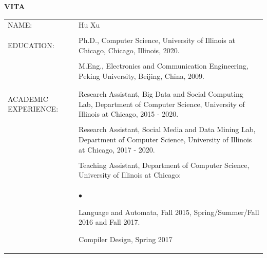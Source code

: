 \documentclass{uicthesi}
\newcommand{\squishlist}{
   \begin{list}{$\bullet$}
    { \setlength{\itemsep}{-.1ex}      \setlength{\parsep}{0ex}
      \setlength{\topsep}{0ex}       \setlength{\partopsep}{0ex}
      \setlength{\leftmargin}{.8em} \setlength{\labelwidth}{1em}
      \setlength{\labelsep}{0.5em} } }
\newcommand{\squishend}{\end{list}}
\begin{document}
\newpage
\clearpage
\pagestyle{pageontop}
\thispagestyle{pageonbottom}
\begin{large}
\begin{center}
{\bfseries VITA}
\end{center}
\end{large}
\begin{tabular}{p{2.8cm}p{10.5cm}}
NAME: & Hu Xu  \\ 
    &\\
EDUCATION:  &Ph.D., Computer Science, University of Illinois at Chicago, Chicago, Illinois, 2020. \\  
            &\\
            &M.Eng., Electronics and Communication Engineering, Peking University, Beijing, China, 2009.\\
            &\\
            &\\
ACADEMIC EXPERIENCE:  &Research Assistant, Big Data and Social Computing Lab, Department of Computer Science, University of Illinois at Chicago, 2015 - 2020. \\
            &\\
			&Research Assistant, Social Media and Data Mining Lab, Department of Computer Science, University of Illinois at Chicago, 2017 - 2020. \\
			&\\
            &Teaching Assistant, Department of Computer Science, University of Illinois at Chicago: \\
            &\squishlist            
            \item Language and Automata, Fall 2015, Spring/Summer/Fall 2016 and Fall 2017.    
            \item Compiler Design, Spring 2017 
            \squishend \\

 \end{tabular}
\end{document}
